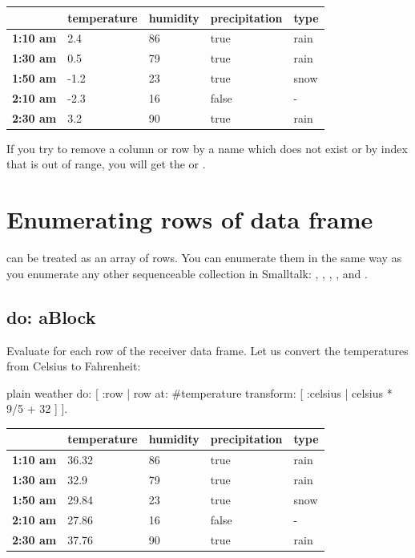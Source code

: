 \documentclass[10pt,twoside,english]{_support/latex/sbabook/sbabook}
\begin{document}
\begin{tabular}{lllll}
\toprule
 & \textbf{temperature} & \textbf{humidity} & \textbf{precipitation} & \textbf{type} \\
\midrule
\textbf{1:10 am} & 2.4 & 86 & true & rain \\
\textbf{1:30 am} & 0.5 & 79 & true & rain \\
\textbf{1:50 am} & -1.2 & 23 & true & snow \\
\textbf{2:10 am} & -2.3 & 16 & false & - \\
\textbf{2:30 am} & 3.2 & 90 & true & rain \\
\bottomrule
\end{tabular}

If you try to remove a column or row by a name which does not exist or by index that is out of range, you will get the  or .
\section{Enumerating rows of data frame}
 can be treated as an array of rows. You can enumerate them in the same way as you enumerate any other sequenceable collection in Smalltalk: , , , , and .
\subsection{do: aBlock}
Evaluate  for each row of the receiver data frame. Let us convert the temperatures from Celsius to Fahrenheit:

\begin{displaycode}{plain}
weather do: [ :row |
  row at: #temperature transform: [ :celsius |
    celsius * 9/5 + 32 ] ].
\end{displaycode}

\begin{tabular}{lllll}
\toprule
 & \textbf{temperature} & \textbf{humidity} & \textbf{precipitation} & \textbf{type} \\
\midrule
\textbf{1:10 am} & 36.32 & 86 & true & rain \\
\textbf{1:30 am} & 32.9 & 79 & true & rain \\
\textbf{1:50 am} & 29.84 & 23 & true & snow \\
\textbf{2:10 am} & 27.86 & 16 & false & - \\
\textbf{2:30 am} & 37.76 & 90 & true & rain \\
\bottomrule
\end{tabular}
\end{document}
